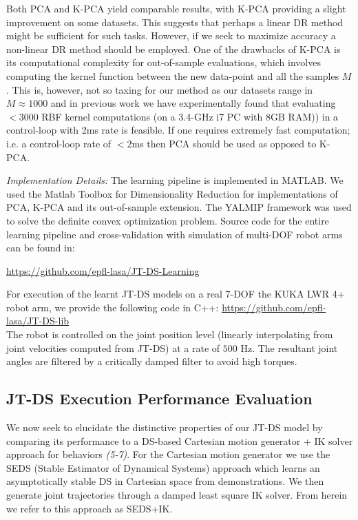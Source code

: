 \documentclass[letterpaper, 10 pt, conference,fleqn]{ieeeconf}
\begin{document}
Both PCA and K-PCA yield comparable results, with K-PCA providing a slight improvement on some datasets. This suggests that perhaps a linear DR method might be sufficient for such tasks. However, if we seek to maximize accuracy a non-linear DR method should be employed. One of the drawbacks of K-PCA is its computational complexity for out-of-sample evaluations, which involves computing the kernel function between the new data-point and all the samples $M$. This is, however, not so taxing for our method as our datasets range in $M\approx1000$ and in previous work \cite{Mirrazavi:IJRR:2017} we have experimentally found that evaluating $<3000$ RBF kernel computations (on a 3.4-GHz i7 PC with 8GB RAM)) in a control-loop with 2ms rate is feasible. If one requires extremely fast computation; i.e. a control-loop rate of $<2$ms then PCA should be used as opposed to K-PCA.


\textit{Implementation Details:} The learning pipeline is implemented in MATLAB. We used the Matlab Toolbox for Dimensionality Reduction \cite{Maaten08dimensionalityreduction} for implementations of PCA, K-PCA and its out-of-sample extension. The YALMIP framework \cite{lofberg2004yalmip} was used to solve the definite convex optimization problem. Source code for the entire learning pipeline and cross-validation with simulation of multi-DOF robot arms can be found in:
\footnotesize  \centerline{\underline{\url{https://github.com/epfl-lasa/JT-DS-Learning}}}
\normalsize

For execution of the learnt JT-DS models on a real 7-DOF the KUKA LWR 4+ robot arm, we provide the following code in C++:
\footnotesize \underline{\url{https://github.com/epfl-lasa/JT-DS-lib}}\\
\normalsize
The robot is controlled on the joint position level (linearly interpolating from joint velocities computed from JT-DS) at a rate of $ 500 $ Hz. The resultant joint angles are filtered by a critically damped filter to avoid high torques.

\subsection{JT-DS Execution Performance Evaluation}
We now seek to elucidate the distinctive properties of our JT-DS model by comparing its performance to a DS-based Cartesian motion generator + IK solver approach for behaviors \textit{(5-7)}. For the Cartesian motion generator we use the SEDS (Stable Estimator of Dynamical Systems) approach \cite{khansari2011learning} which learns an asymptotically stable DS in Cartesian space from demonstrations. We then generate joint trajectories through a damped least square IK solver. From herein we refer to this approach as SEDS+IK.
\end{document}
